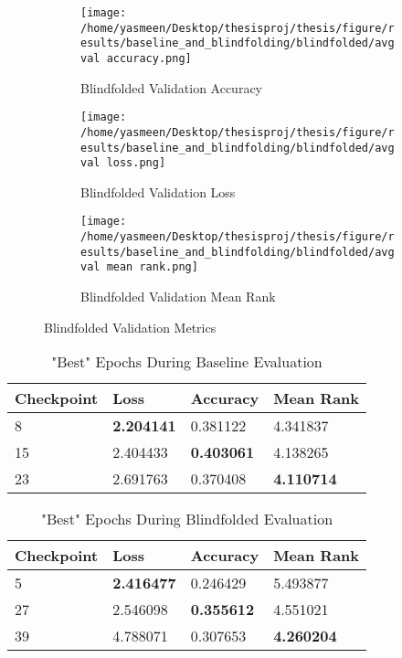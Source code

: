 \begin{figure}[ht!]
     \centering
     \begin{subfigure}[b]{0.3\textwidth}
         \centering
         \texttt{[image: /home/yasmeen/Desktop/thesisproj/thesis/figure/results/baseline\_and\_blindfolding/blindfolded/avg val accuracy.png]}
         \caption{Blindfolded Validation Accuracy}
         \label{fig:blindfolded_accuracy}
     \end{subfigure}
     \hfill
     \begin{subfigure}[b]{0.3\textwidth}
         \centering
         \texttt{[image: /home/yasmeen/Desktop/thesisproj/thesis/figure/results/baseline\_and\_blindfolding/blindfolded/avg val loss.png]}
         \caption{Blindfolded Validation Loss}
         \label{fig:blindfolded_loss}
     \end{subfigure}
     \hfill
     \begin{subfigure}[b]{0.3\textwidth}
         \centering
         \texttt{[image: /home/yasmeen/Desktop/thesisproj/thesis/figure/results/baseline\_and\_blindfolding/blindfolded/avg val mean rank.png]}
         \caption{Blindfolded Validation Mean Rank}
         \label{fig:blindfolded_mean_rank}
     \end{subfigure}
     \caption{Blindfolded Validation Metrics}
     \label{fig:blindfolded_metrics}
\end{figure}

\begin{table}[ht!]
\centering
\caption{"Best" Epochs During Baseline Evaluation}
\begin{tabular}{l | l | l | l}
Checkpoint & Loss & Accuracy & Mean Rank \\
\hline
8 & \textbf{2.204141} & 0.381122 & 4.341837 \\
15 & 2.404433 & \textbf{0.403061} & 4.138265 \\
23 & 2.691763 & 0.370408 & \textbf{4.110714}
\end{tabular}
\label{tab:best_baseline}
\end{table}

\begin{table}[ht!]
\centering
\caption{"Best" Epochs During Blindfolded Evaluation}
\begin{tabular}{l | l | l | l}
Checkpoint & Loss & Accuracy & Mean Rank \\
\hline
5 & \textbf{2.416477} & 0.246429 & 5.493877 \\
27 & 2.546098 & \textbf{0.355612} & 4.551021 \\
39 & 4.788071 & 0.307653 & \textbf{4.260204}
\end{tabular}
\label{tab:best_blindfolded}
\end{table}


